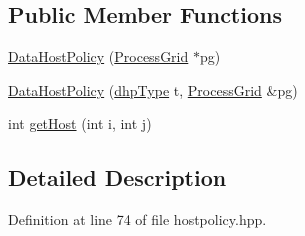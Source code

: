 \subsection*{Public Member Functions}
\begin{DoxyCompactItemize}
\item 
\hyperlink{class_data_host_policy_af9d62fb69383867bb611ef72466f4843}{DataHostPolicy} (\hyperlink{class_process_grid}{ProcessGrid} $\ast$pg)
\item 
\hyperlink{class_data_host_policy_a64bd8132dbd59bf8939e9e8f25d5b3c3}{DataHostPolicy} (\hyperlink{class_data_host_policy_a825ddbca708ed5e3ea553ed70706b2cd}{dhpType} t, \hyperlink{class_process_grid}{ProcessGrid} \&pg)
\item 
int \hyperlink{class_data_host_policy_a6117b250bbf462c0935362e45855be1e}{getHost} (int i, int j)
\end{DoxyCompactItemize}


\subsection{Detailed Description}


Definition at line 74 of file hostpolicy.hpp.

